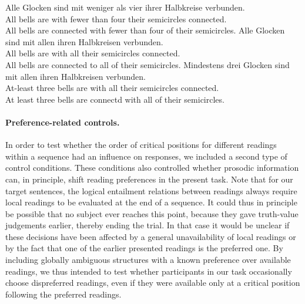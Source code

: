 \documentclass[fleqn,reqno,10pt,draft]{article}
\begin{document}
\begin{exe}
\ex \label{bsp:controls-es}
  \begin{xlist}
\ex \label{bsp:controls-es-1} \gll Alle Glocken sind mit weniger als
  vier ihrer Halbkreise verbunden. \\ 
All bells are with fewer than four their semicircles connected.\\
\trans All bells are connected with fewer than four of their semicircles.  
\ex \label{bsp:controls-es-2} \gll Alle Glocken sind mit allen ihren Halbkreisen verbunden.\\
All bells are with all their semicircles connected.\\
\trans All bells are connected to all of their semicircles. 
\ex \label{bsp:controls-es-3} \gll Mindestens drei Glocken sind mit
  allen ihren Halbkreisen verbunden.\\ 
  At-least three bells are with all  their semicircles connected.\\
  \trans At least three bells are connectd with all of their semicircles.
\end{xlist}
\end{exe}

\paragraph{Preference-related controls.} In order to test whether the
order of critical positions for different readings within a sequence
had an influence on responses, we included a second type of control
conditions. These conditions also controlled whether prosodic
information can, in principle, shift reading preferences in the
present task. Note that for our target sentences, the logical
entailment relations between readings always require local readings to
be evaluated at the end of a sequence. It could thus in principle be
possible that no subject ever reaches this point, because they gave
truth-value judgements earlier, thereby ending the trial. In that case
it would be unclear if these decisions have been affected by a general
unavailability of local readings or by the fact that one of the
earlier presented readings is the preferred one. By including globally
ambiguous structures with a known preference over available readings,
we thus intended to test whether participants in our task occasionally
choose dispreferred readings, even if they were available only at a
critical position following the preferred readings.
\end{document}
